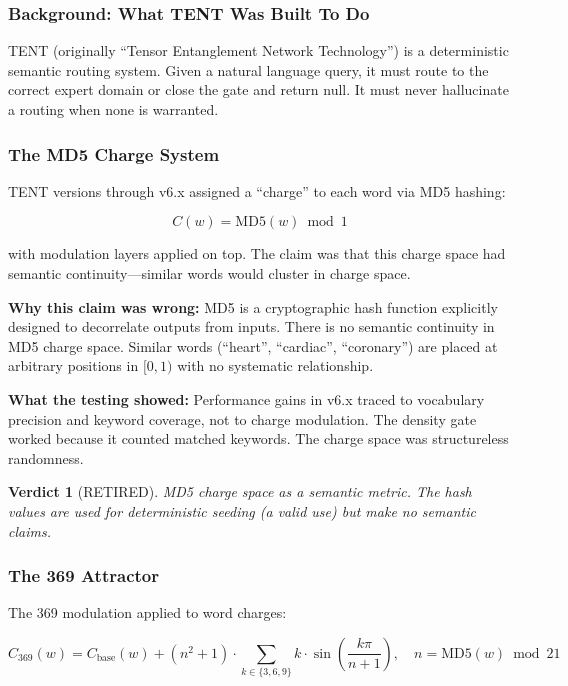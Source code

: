 \documentclass[11pt]{article}
\newtheorem{verdict}{Verdict}
\begin{document}
\subsubsection{Background: What TENT Was Built To Do}

TENT (originally ``Tensor Entanglement Network Technology'') is a deterministic semantic routing system. Given a natural language query, it must route to the correct expert domain or close the gate and return null. It must never hallucinate a routing when none is warranted.

\subsubsection{The MD5 Charge System}

TENT versions through v6.x assigned a ``charge'' to each word via MD5 hashing:

\begin{equation}
  C(w) = \text{MD5}(w) \bmod 1
\end{equation}

with modulation layers applied on top. The claim was that this charge space had semantic continuity---similar words would cluster in charge space.

\textbf{Why this claim was wrong:} MD5 is a cryptographic hash function explicitly designed to decorrelate outputs from inputs. There is no semantic continuity in MD5 charge space. Similar words (``heart'', ``cardiac'', ``coronary'') are placed at arbitrary positions in $[0,1)$ with no systematic relationship.

\textbf{What the testing showed:} Performance gains in v6.x traced to vocabulary precision and keyword coverage, not to charge modulation. The density gate worked because it counted matched keywords. The charge space was structureless randomness.

\begin{verdict}[\textcolor{warnyellow}{RETIRED}]
MD5 charge space as a semantic metric. The hash values are used for deterministic seeding (a valid use) but make no semantic claims.
\end{verdict}

\subsubsection{The 369 Attractor}

The 369 modulation applied to word charges:

\begin{equation}
  C_{369}(w) = C_{\text{base}}(w) + (n^2 + 1) \cdot \sum_{k \in \{3,6,9\}} k \cdot \sin\!\left(\frac{k\pi}{n+1}\right), \quad n = \text{MD5}(w) \bmod 21
\end{equation}
\end{document}
